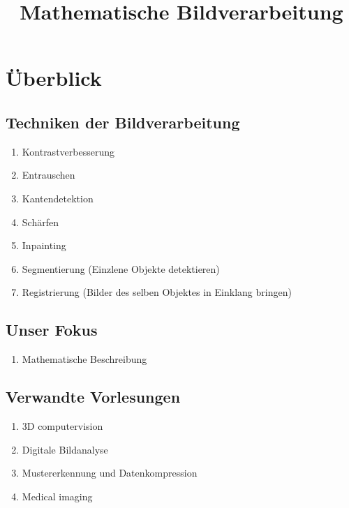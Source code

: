 \documentclass{article}
\theoremstyle{plain}
\theoremstyle{definition}
\numberwithin{equation}{section}
\begin{document}
\title{Mathematische Bildverarbeitung}
\date{}
\maketitle

\tableofcontents

\newpage

\section{Überblick}
    \subsection{Techniken der Bildverarbeitung}
        \begin{enumerate}[label=\textbullet]
            \item Kontrastverbesserung
            \item Entrauschen
            \item Kantendetektion
            \item Schärfen
            \item Inpainting
            \item Segmentierung (Einzlene Objekte detektieren)
            \item Registrierung (Bilder des selben Objektes in Einklang bringen)
        \end{enumerate}

    \subsection{Unser Fokus}
        \begin{enumerate}[label=\textbullet]
            \item Mathematische Beschreibung
        \end{enumerate}

    \subsection{Verwandte Vorlesungen}
        \begin{enumerate}[label=\textbullet]
            \item 3D computervision
            \item Digitale Bildanalyse
            \item Mustererkennung und Datenkompression
            \item Medical imaging
        \end{enumerate}
\end{document}
